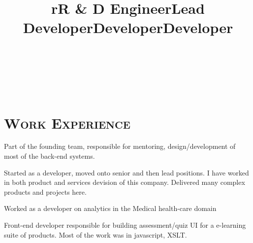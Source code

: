 \begin{resume}
\begin{formatb}
  \title{r}\\
  \\
  \body\\
\end{formatb}

\section{\textsc{Work Experience}}

\title{R \& D Engineer}
\begin{position}
Part of the founding team, responsible for mentoring, design/development of most of the back-end systems. 
\end{position}


\title{Lead Developer}
\begin{position}
Started as a developer, moved onto senior and then lead positions. I have worked in both product and services devision of this company. Delivered many complex products and projects here.
\end{position}

\title{Developer}
\begin{position}
Worked as a developer on analytics in the Medical health-care domain
\end{position}

\title{Developer}
\begin{position}
Front-end developer responsible  for building assessment/quiz UI for a e-learning suite of products. Most of the work was in javascript, XSLT. 
\end{position}







\end{resume}
